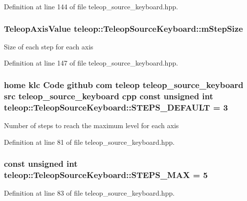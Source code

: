 Definition at line 144 of file teleop\_\-source\_\-keyboard.hpp.

\subsubsection[{mStepSize}]{\setlength{\rightskip}{0pt plus 5cm}TeleopAxisValue {\bf teleop::TeleopSourceKeyboard::mStepSize}\hspace{0.3cm}{\ttfamily  [private]}}\label{classteleop_1_1TeleopSourceKeyboard_a84793b148b522a324a52d5102f7c1266}
Size of each step for each axis 

Definition at line 147 of file teleop\_\-source\_\-keyboard.hpp.

\subsubsection[{STEPS\_\-DEFAULT}]{\setlength{\rightskip}{0pt plus 5cm}home klc Code github com teleop teleop\_\-source\_\-keyboard src teleop\_\-source\_\-keyboard cpp const unsigned int {\bf teleop::TeleopSourceKeyboard::STEPS\_\-DEFAULT} = 3\hspace{0.3cm}{\ttfamily  [static]}}\label{classteleop_1_1TeleopSourceKeyboard_a24308747c5d7de74b0220f1e7b9b6030}
Number of steps to reach the maximum level for each axis 

Definition at line 81 of file teleop\_\-source\_\-keyboard.hpp.

\subsubsection[{STEPS\_\-MAX}]{\setlength{\rightskip}{0pt plus 5cm}const unsigned int {\bf teleop::TeleopSourceKeyboard::STEPS\_\-MAX} = 5\hspace{0.3cm}{\ttfamily  [static]}}\label{classteleop_1_1TeleopSourceKeyboard_a82e7603533531b605f3e148d1de7366e}


Definition at line 83 of file teleop\_\-source\_\-keyboard.hpp.

